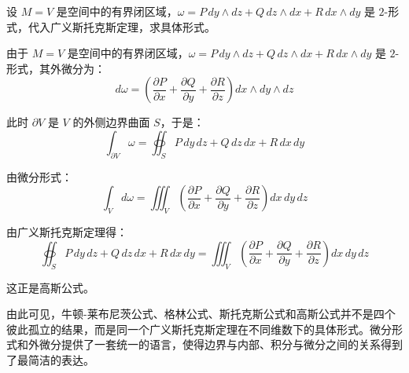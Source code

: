 \begin{myexample}
  设 \(M=V\) 是空间中的有界闭区域，\(\omega=P\,dy\wedge dz+Q\,dz\wedge dx+R\,dx\wedge dy\) 是 \(2\)-形式，代入广义斯托克斯定理，求具体形式。
  
  由于 \(M=V\) 是空间中的有界闭区域，\(\omega=P\,dy\wedge dz+Q\,dz\wedge dx+R\,dx\wedge dy\) 是 \(2\)-形式，其外微分为：
\[
d\omega
=
\left(\frac{\partial P}{\partial x}
+\frac{\partial Q}{\partial y}
+\frac{\partial R}{\partial z}\right)dx\wedge dy\wedge dz
\]

此时 \(\partial V\) 是 \(V\) 的外侧边界曲面 \(S\)，于是：
\[
\int_{\partial V}\omega
=
\oiint_S P\,dy\,dz+Q\,dz\,dx+R\,dx\,dy
\]

由微分形式：
\[
\int_V d\omega
=
\iiint_V
\left(\frac{\partial P}{\partial x}
+\frac{\partial Q}{\partial y}
+\frac{\partial R}{\partial z}\right)dx\,dy\,dz
\]

由广义斯托克斯定理得：
\[
\oiint_S P\,dy\,dz+Q\,dz\,dx+R\,dx\,dy
=
\iiint_V
\left(\frac{\partial P}{\partial x}
+\frac{\partial Q}{\partial y}
+\frac{\partial R}{\partial z}\right)dx\,dy\,dz
\]

这正是高斯公式。

\end{myexample}


由此可见，牛顿-莱布尼茨公式、格林公式、斯托克斯公式和高斯公式并不是四个彼此孤立的结果，而是同一个广义斯托克斯定理在不同维数下的具体形式。微分形式和外微分提供了一套统一的语言，使得边界与内部、积分与微分之间的关系得到了最简洁的表达。
